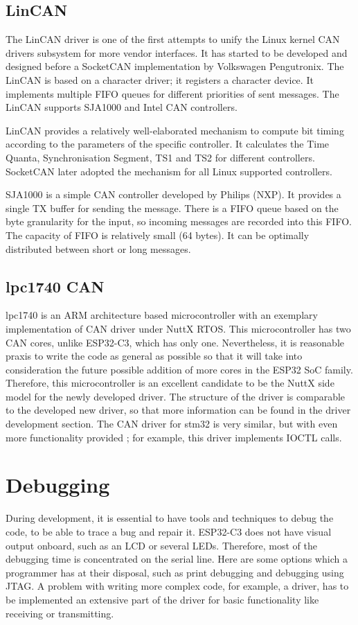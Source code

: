 \documentclass{ctuthesis}
\begin{document}
 \subsection{LinCAN}
 The LinCAN driver is one of the first attempts to unify the Linux kernel CAN drivers subsystem for more vendor interfaces\cite{lincan}. It has started to be developed and designed before a SocketCAN implementation by Volkswagen Pengutronix. The LinCAN is based on a character driver; it registers a character device. It implements multiple FIFO queues for different priorities of sent messages. The LinCAN supports SJA1000 and Intel CAN controllers. \newline 

 \quad LinCAN provides a relatively well-elaborated mechanism to compute bit timing according to the parameters of the specific controller\cite{lincan-code}. It calculates the Time Quanta, Synchronisation Segment, TS1 and TS2 for different controllers. SocketCAN later adopted the mechanism for all Linux supported controllers. \newline

 \quad SJA1000 is a simple CAN controller developed by Philips (NXP)\cite{sja-1000}. It provides a single TX buffer for sending the message. There is a FIFO queue based on the byte granularity for the input, so incoming messages are recorded into this FIFO. The capacity of FIFO is relatively small (64 bytes). It can be optimally distributed between short or long messages.

 \subsection{lpc17\text{-}40 CAN}
 lpc17\text{-}40 is an ARM architecture based microcontroller with an exemplary implementation of CAN driver under NuttX RTOS. This microcontroller has two CAN cores, unlike ESP32-C3, which has only one. Nevertheless, it is reasonable praxis to write the code as general as possible so that it will take into consideration the future possible addition of more cores in the ESP32 SoC family. Therefore, this microcontroller is an excellent candidate to be the NuttX side model for the newly developed driver. The structure of the driver is comparable to the developed new driver, so that more information can be found in the driver development section.  The CAN driver for stm32 is very similar, but with even more functionality provided ; for example, this driver implements IOCTL calls.
 
 \section{Debugging}
 During development, it is essential to have tools and techniques to debug the code, to be able to trace a bug and repair it. ESP32-C3 does not have visual output onboard, such as an LCD or several LEDs. Therefore, most of the debugging time is concentrated on the serial line. Here are some options which a programmer has at their disposal, such as print debugging and debugging using JTAG. A problem with writing more complex code, for example, a driver, has to be implemented an extensive part of the driver for basic functionality like receiving or transmitting.  
 
\end{document}
